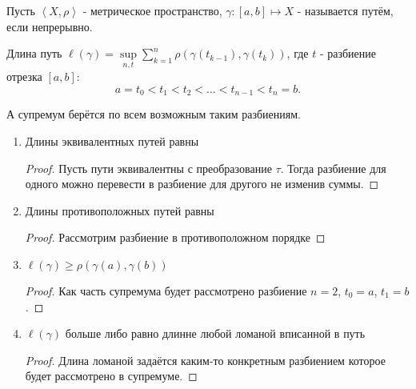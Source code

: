 
\begin{definition} \thmslashn 

    Пусть $\left<X, \rho\right>$ - метрическое пространство, $\gamma : [a, b] \mapsto X$ - называется путём, если непрерывно.

    Длина путь $\ell(\gamma) = \sup\limits_{n, t} \sum\limits_{k=1}^{n} \rho(\gamma(t_{k-1}), \gamma(t_{k}))$, где $t$ - разбиение отрезка $[a, b]$:
    \[ a = t_0 < t_1 < t_2 < \ldots < t_{n-1} < t_{n} = b .\]

    А супремум берётся по всем возможным таким разбиениям.
\end{definition}
\begin{properties} \thmslashn

    \begin{enumerate}
        \item Длины эквивалентных путей равны
            \begin{proof} \thmslashn
            
                Пусть пути эквивалентны с преобразование $\tau$. Тогда разбиение для одного можно перевести в разбиение для другого не изменив суммы.
            \end{proof}
        \item Длины противоположных путей равны
            \begin{proof} \thmslashn
            
                Рассмотрим разбиение в противоположном порядке
            \end{proof}
        \item $\ell(\gamma) \ge \rho(\gamma(a), \gamma(b))$
            \begin{proof} \thmslashn
            
                Как часть супремума будет рассмотрено разбиение $n=2$, $t_{0} = a$, $t_{1} = b$.
            \end{proof}
        \item $\ell(\gamma)$ больше либо равно длинне любой ломаной вписанной в путь
            \begin{proof} \thmslashn
            
                Длина ломаной задаётся каким-то конкретным разбиением которое будет рассмотрено в супремуме.
            \end{proof}
    \end{enumerate}
\end{properties}
